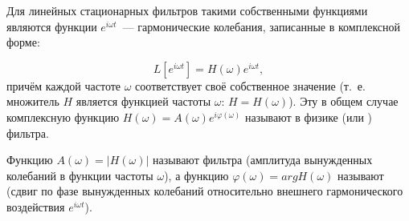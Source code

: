 Для линейных стационарных фильтров такими собственными функциями являются
функции $e^{i\omega t}$~--- гармонические
колебания, записанные в комплексной форме:

\begin{equation*}
    L\left[e^{i\omega t}\right]=H(\omega)e^{i\omega t},
\end{equation*}
причём каждой частоте $\omega$ соответствует своё собственное значение (т.~е.
множитель $H$ является функцией частоты
$\omega$: $H=H(\omega)$). Эту в общем случае комплексную функцию
$H(\omega)=A(\omega)e^{i\varphi(\omega)}$ называют в физике
 (или )
фильтра.

Функцию $A(\omega)=|H(\omega)|$ называют 
фильтра (амплитуда вынужденных колебаний в
функции частоты $\omega$), а функцию $\varphi(\omega)= arg H(\omega)$ называют
 (сдвиг по фазе
вынужденных колебаний относительно внешнего гармонического воздействия
$e^{i\omega t}$).



%





